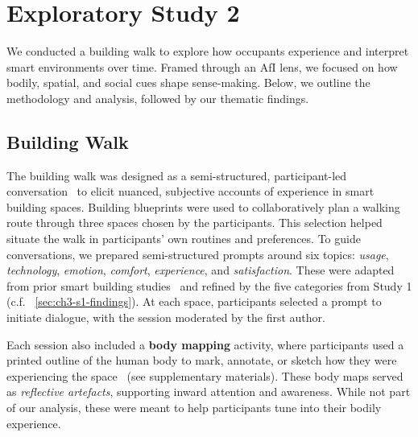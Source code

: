 \section{Exploratory Study 2}
\label{sec:ch3-study2}
We conducted a building walk to explore how occupants experience and interpret smart environments over time. Framed through an AfI lens, we focused on how bodily, spatial, and social cues shape sense-making. Below, we outline the methodology and analysis, followed by our thematic findings.

\subsection{Building Walk}
\label{subsec:ch3-s2-methodology}
The building walk was designed as a semi-structured, participant-led conversation~\cite{mitchell2020no} to elicit nuanced, subjective accounts of experience in smart building spaces. Building blueprints were used to collaboratively plan a walking route through three spaces chosen by the participants. This selection helped situate the walk in participants’ own routines and preferences. To guide conversations, we prepared semi-structured prompts around six topics: \textit{usage}, \textit{technology}, \textit{emotion}, \textit{comfort}, \textit{experience}, and \textit{satisfaction}. These were adapted from prior smart building studies~\cite{margariti2021understanding, mitchell2020no} and refined by the five categories from Study 1 (c.f. ~\autoref{sec:ch3-s1-findings}). At each space, participants selected a prompt to initiate dialogue, with the session moderated by the first author.

Each session also included a \textbf{body mapping} activity, where participants used a printed outline of the human body to mark, annotate, or sketch how they were experiencing the space~\cite{turmo2023towards} (see supplementary materials). These body maps served as \textit{reflective artefacts}, supporting inward attention and awareness. While not part of our analysis, these were meant to help participants tune into their bodily experience.

